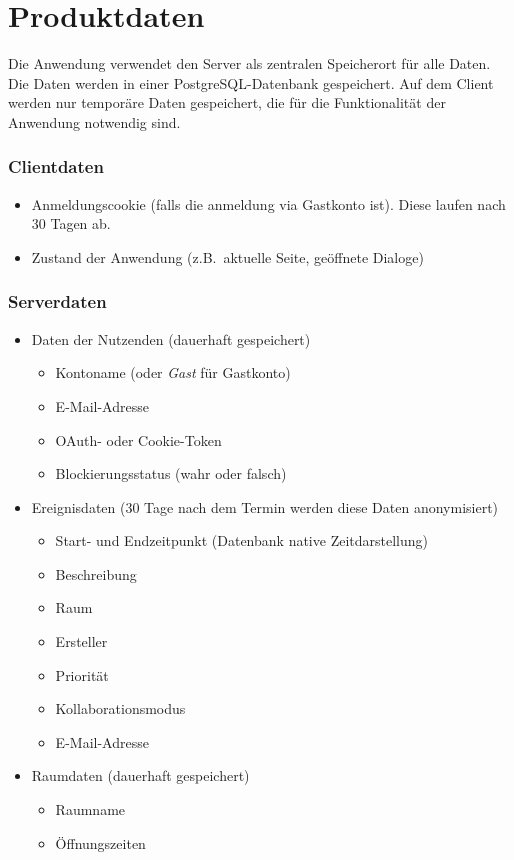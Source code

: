 
\chapter{Produktdaten}
\label{chap:product_data}

Die Anwendung verwendet den Server als zentralen Speicherort für alle Daten.
Die Daten werden in einer \gls{PostgreSQL}-Datenbank gespeichert.
Auf dem Client werden nur temporäre Daten gespeichert, die für die Funktionalität der Anwendung notwendig sind.


\subsection*{Clientdaten}
\begin{itemize}
    \item Anmeldungscookie (falls die anmeldung via Gastkonto ist).
          Diese laufen nach 30 Tagen ab.
    \item Zustand der Anwendung (z.B.\ aktuelle Seite, geöffnete Dialoge)
\end{itemize}

\subsection*{Serverdaten}
\begin{itemize}
    \item Daten der Nutzenden (dauerhaft gespeichert)
    \begin{itemize}
        \item Kontoname (oder \textit{Gast} für Gastkonto)
        \item E-Mail-Adresse
        \item OAuth- oder Cookie-Token
        \item Blockierungsstatus (wahr oder falsch)
    \end{itemize}
    \item Ereignisdaten (30 Tage nach dem Termin werden diese Daten anonymisiert)
    \begin{itemize}
        \item Start- und Endzeitpunkt (Datenbank native Zeitdarstellung)
        \item Beschreibung
        \item Raum
        \item Ersteller
        \item Priorität
        \item Kollaborationsmodus
        \item E-Mail-Adresse
    \end{itemize}
    \item Raumdaten (dauerhaft gespeichert)
    \begin{itemize}
        \item Raumname
        \item Öffnungszeiten
    \end{itemize}
\end{itemize}
